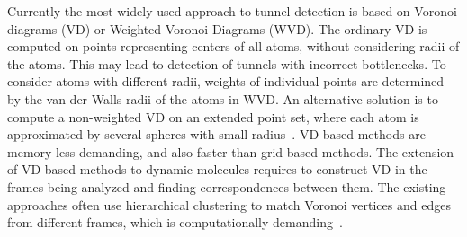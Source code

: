 \documentclass{llncs}
\begin{document}
Currently the most widely used approach to tunnel detection is based on Voronoi diagrams (VD) or Weighted Voronoi Diagrams (WVD).
The ordinary VD is computed on points representing centers of all atoms, without considering radii of the atoms.
This may lead to detection of tunnels with incorrect bottlenecks. %
To consider atoms with different radii, weights of individual points are determined by the van der Walls radii of the atoms in WVD.
An alternative solution is to compute a non-weighted VD on an extended point set, where 
each atom is approximated by several spheres with small radius~\cite{yaffe2008,caver3}.
VD-based methods are memory less demanding, and also faster than grid-based methods.
The extension of VD-based methods to dynamic molecules requires to construct VD in the frames being analyzed and 
finding correspondences between them.
The existing approaches often use hierarchical clustering to match Voronoi vertices and edges from different frames, which is computationally demanding~\cite{lindow2012dynamic,caverDetails}.
\end{document}
